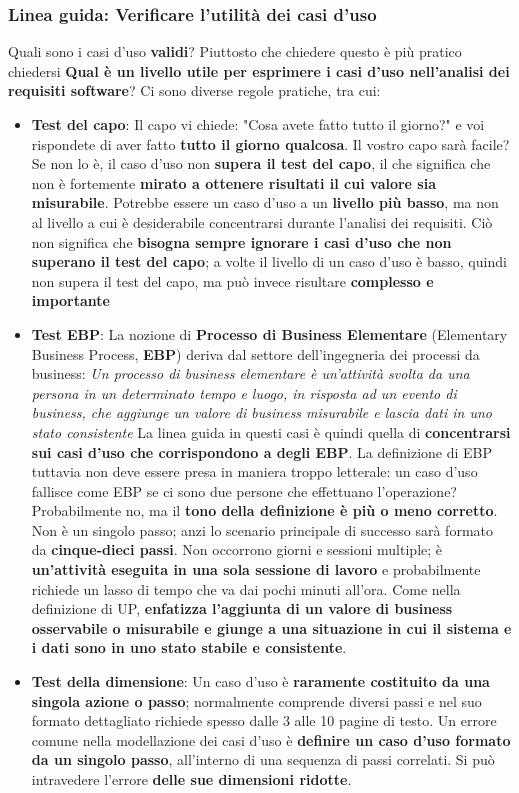 \documentclass[12pt]{article}
\begin{document}
\subsubsection{Linea guida: Verificare l'utilità dei casi d'uso}
Quali sono i casi d'uso \textbf{validi}? Piuttosto che chiedere questo è più pratico chiedersi \textbf{Qual è un livello utile per esprimere i casi d'uso nell'analisi dei requisiti software}?
Ci sono diverse regole pratiche, tra cui:
\begin{itemize}
    \item \textbf{Test del capo}: Il capo vi chiede: "Cosa avete fatto tutto il giorno?" e voi rispondete di aver fatto \textbf{tutto il giorno qualcosa}. Il vostro capo sarà facile?
    Se non lo è, il caso d'uso non \textbf{supera il test del capo}, il che significa che non è fortemente \textbf{mirato a ottenere risultati il cui valore sia misurabile}.
    Potrebbe essere un caso d'uso a un \textbf{livello più basso}, ma non al livello a cui è desiderabile concentrarsi durante l'analisi dei requisiti.
    Ciò non significa che \textbf{bisogna sempre ignorare i casi d'uso che non superano il test del capo}; a volte il livello di un caso d'uso è basso, quindi non supera il test del capo, ma può invece risultare \textbf{complesso e importante}
    \item \textbf{Test EBP}: La nozione di \textbf{Processo di Business Elementare} (Elementary Business Process, \textbf{EBP}) deriva dal settore dell'ingegneria dei processi da business: \newline
    \textit{Un processo di business elementare è un'attività svolta da una persona in un determinato tempo e luogo, in risposta ad un evento di business, che aggiunge un valore di business misurabile e lascia dati in uno stato consistente} \newline
    La linea guida in questi casi è quindi quella di \textbf{concentrarsi sui casi d'uso che corrispondono a degli EBP}.
    La definizione di EBP tuttavia non deve essere presa in maniera troppo letterale: un caso d'uso fallisce come EBP se ci sono due persone che effettuano l'operazione?
    Probabilmente no, ma il \textbf{tono della definizione è più o meno corretto}.
    Non è un singolo passo; anzi lo scenario principale di successo sarà formato da \textbf{cinque-dieci passi}.
    Non occorrono giorni e sessioni multiple; è \textbf{un'attività eseguita in una sola sessione di lavoro} e probabilmente richiede un lasso di tempo che va dai pochi minuti all'ora.
    Come nella definizione di UP, \textbf{enfatizza l'aggiunta di un valore di business osservabile o misurabile e giunge a una situazione in cui il sistema e i dati sono in uno stato stabile e consistente}.
    \item \textbf{Test della dimensione}: Un caso d'uso è \textbf{raramente costituito da una singola azione o passo}; normalmente comprende diversi passi e nel suo formato dettagliato richiede spesso dalle 3 alle 10 pagine di testo.
    Un errore comune nella modellazione dei casi d'uso è \textbf{definire un caso d'uso formato da un singolo passo}, all'interno di una sequenza di passi correlati. Si può intravedere l'errore \textbf{delle sue dimensioni ridotte}.
\end{itemize}
\end{document}
